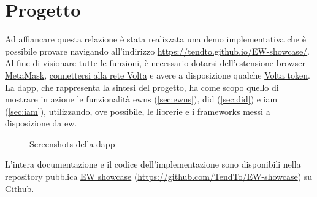 \chapter*{Progetto}
Ad affiancare questa relazione è stata realizzata una demo implementativa che è possibile provare navigando all'indirizzo \url{https://tendto.github.io/EW-showcase/}.
Al fine di visionare tutte le funzioni, è necessario dotarsi dell'estensione browser \href{https://metamask.io/}{MetaMask}, \href{https://energyweb.atlassian.net/wiki/spaces/EWF/pages/703201459/Volta+Connecting+to+Remote+RPC+and+Metamask}{connettersi alla rete Volta} e avere a disposizione qualche \href{https://voltafaucet.energyweb.org/}{Volta token}. \\

La \gls{dapp}, che rappresenta la sintesi del progetto, ha come scopo quello di mostrare in azione le funzionalità \gls{ewns} (\autoref{sec:ewns}), \gls{did} (\autoref{sec:did}) e \gls{iam} (\autoref{sec:iam}), utilizzando, ove possibile, le librerie e i frameworks messi a disposizione da \gls{ew}.

\begin{figure}[h]
    \centering
    \qquad
    \caption{Screenshots della \gls{dapp}}
    \label{lab:project}
\end{figure}

L'intera documentazione e il codice dell'implementazione sono disponibili nella repository pubblica \href{https://github.com/TendTo/EW-showcase}{EW showcase} (\url{https://github.com/TendTo/EW-showcase}) su Github.